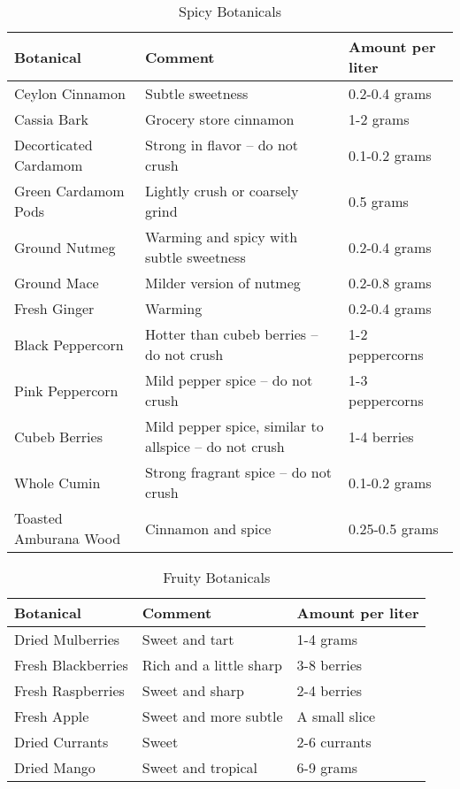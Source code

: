 \documentclass[letterpaper]{recipePMG}
\begin{document}
\begin{table}[H]
    \centering
    \caption{Spicy Botanicals}
    \begin{tabular}{@{}p{1.25in}p{3in}p{1.25in}@{}}
        \toprule
      Botanical &  Comment & Amount per liter \\
        \midrule
		Ceylon Cinnamon & Subtle sweetness & 0.2-0.4 grams \\
		Cassia Bark & Grocery store cinnamon & 1-2 grams \\
		Decorticated Cardamom & Strong in flavor -- do not crush & 0.1-0.2 grams \\
		Green Cardamom Pods & Lightly crush or coarsely grind & 0.5 grams \\
		Ground Nutmeg & Warming and spicy with subtle sweetness & 0.2-0.4 grams \\
		Ground Mace & Milder version of nutmeg & 0.2-0.8 grams \\
		Fresh Ginger & Warming & 0.2-0.4 grams \\
		Black Peppercorn & Hotter than cubeb berries -- do not crush & 1-2 peppercorns \\
		Pink Peppercorn & Mild pepper spice -- do not crush & 1-3 peppercorns \\
		Cubeb Berries & Mild pepper spice, similar to allspice -- do not crush & 1-4 berries \\
		Whole Cumin & Strong fragrant spice -- do not crush & 0.1-0.2 grams \\
        Toasted Amburana Wood & Cinnamon and spice & 0.25-0.5 grams \\
\end{tabular}
    \label{tab:spicy}
\end{table}

\begin{table}[H]
    \centering
    \caption{Fruity Botanicals}
    \begin{tabular}{@{}p{1.25in}p{3in}p{1.25in}@{}}
        \toprule
      Botanical &  Comment & Amount per liter \\
        \midrule
		Dried Mulberries & Sweet and tart & 1-4 grams \\
		Fresh Blackberries & Rich and a little sharp &  3-8 berries \\
		Fresh Raspberries & Sweet and sharp & 2-4 berries \\
		Fresh Apple & Sweet and more subtle & A small slice \\
		Dried Currants & Sweet & 2-6 currants \\
		Dried Mango & Sweet and tropical & 6-9 grams \\
\end{tabular}
    \label{tab:fruity}
\end{table}
\end{document}
